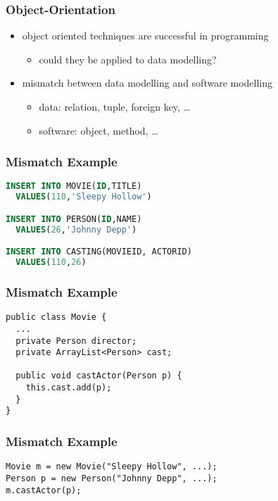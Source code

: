 \documentclass[dvipsnames]{beamer}
\theoremstyle{plain}
\begin{document}
\begin{frame}
  \frametitle{Object-Orientation}

  \begin{itemize}
    \item object oriented techniques are successful in programming
    \begin{itemize}
      \item could they be applied to data modelling?
    \end{itemize}

    \pause
    \bigskip
    \item mismatch between data modelling and software modelling
    \begin{itemize}
      \item data: relation, tuple, foreign key, \ldots
      \item software: object, method, \ldots
    \end{itemize}
  \end{itemize}
\end{frame}

\begin{frame}[fragile]
  \frametitle{Mismatch Example}

  \begin{example}
    \begin{lstlisting}[language=SQL]
INSERT INTO MOVIE(ID,TITLE)
  VALUES(110,'Sleepy Hollow')

INSERT INTO PERSON(ID,NAME)
  VALUES(26,'Johnny Depp')

INSERT INTO CASTING(MOVIEID, ACTORID)
  VALUES(110,26)
    \end{lstlisting}
  \end{example}
\end{frame}

\begin{frame}[fragile]
  \frametitle{Mismatch Example}

  \begin{example}
    \begin{lstlisting}
public class Movie {
  ...
  private Person director;
  private ArrayList<Person> cast;

  public void castActor(Person p) {
    this.cast.add(p);
  }
}
    \end{lstlisting}
  \end{example}
\end{frame}

\begin{frame}[fragile]
  \frametitle{Mismatch Example}

  \begin{example}
    \begin{lstlisting}
Movie m = new Movie("Sleepy Hollow", ...);
Person p = new Person("Johnny Depp", ...);
m.castActor(p);
    \end{lstlisting}
  \end{example}
\end{frame}
\end{document}
